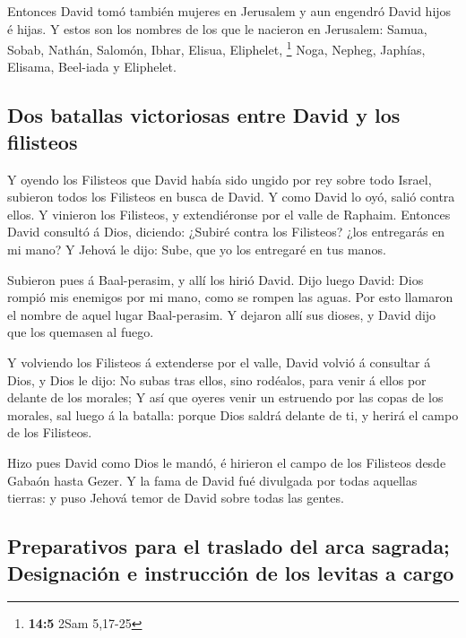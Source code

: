  Entonces David tomó también mujeres en Jerusalem y aun
engendró David hijos é hijas.  Y estos son los nombres de
los que le nacieron en Jerusalem: Samua, Sobab, Nathán, Salomón,
 Ibhar, Elisua, Eliphelet, \footnote{\textbf{14:5} 2Sam
  5,17-25}  Noga, Nepheg, Japhías,  Elisama,
Beel-iada y Eliphelet.

\hypertarget{dos-batallas-victoriosas-entre-david-y-los-filisteos}{%
\subsection{Dos batallas victoriosas entre David y los
filisteos}\label{dos-batallas-victoriosas-entre-david-y-los-filisteos}}

 Y oyendo los Filisteos que David había sido ungido por rey
sobre todo Israel, subieron todos los Filisteos en busca de David. Y
como David lo oyó, salió contra ellos.  Y vinieron los
Filisteos, y extendiéronse por el valle de Raphaim. 
Entonces David consultó á Dios, diciendo: ¿Subiré contra los Filisteos?
¿los entregarás en mi mano? Y Jehová le dijo: Sube, que yo los entregaré
en tus manos.

 Subieron pues á Baal-perasim, y allí los hirió David. Dijo
luego David: Dios rompió mis enemigos por mi mano, como se rompen las
aguas. Por esto llamaron el nombre de aquel lugar Baal-perasim.
 Y dejaron allí sus dioses, y David dijo que los quemasen
al fuego.

 Y volviendo los Filisteos á extenderse por el valle,
 David volvió á consultar á Dios, y Dios le dijo: No subas
tras ellos, sino rodéalos, para venir á ellos por delante de los
morales;  Y así que oyeres venir un estruendo por las copas
de los morales, sal luego á la batalla: porque Dios saldrá delante de
ti, y herirá el campo de los Filisteos.

 Hizo pues David como Dios le mandó, é hirieron el campo de
los Filisteos desde Gabaón hasta Gezer.  Y la fama de David
fué divulgada por todas aquellas tierras: y puso Jehová temor de David
sobre todas las gentes.

\hypertarget{preparativos-para-el-traslado-del-arca-sagrada-designaciuxf3n-e-instrucciuxf3n-de-los-levitas-a-cargo}{%
\subsection{Preparativos para el traslado del arca sagrada; Designación
e instrucción de los levitas a
cargo}\label{preparativos-para-el-traslado-del-arca-sagrada-designaciuxf3n-e-instrucciuxf3n-de-los-levitas-a-cargo}}

